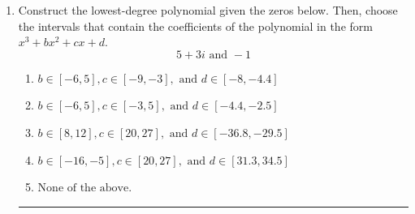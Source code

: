 \documentclass[14pt]{extbook}
\newcommand{\litem}[1]{\item#1\hspace*{-1cm}\rule{\textwidth}{0.4pt}}
\begin{document}
\begin{enumerate}
{\begin{enumerate}[label=\Alph*.]
\end{enumerate} }
\litem{
Construct the lowest-degree polynomial given the zeros below. Then, choose the intervals that contain the coefficients of the polynomial in the form $x^3+bx^2+cx+d$.\[ 5 + 3 i \text{ and } -1 \]\begin{enumerate}[label=\Alph*.]
\item \( b \in [-6, 5], c \in [-9, -3], \text{ and } d \in [-8, -4.4] \)
\item \( b \in [-6, 5], c \in [-3, 5], \text{ and } d \in [-4.4, -2.5] \)
\item \( b \in [8, 12], c \in [20, 27], \text{ and } d \in [-36.8, -29.5] \)
\item \( b \in [-16, -5], c \in [20, 27], \text{ and } d \in [31.3, 34.5] \)
\item \( \text{None of the above.} \)


\end{enumerate}}
\end{enumerate}
\end{document}
